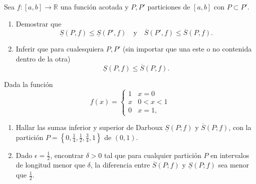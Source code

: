 \documentclass{book}
\begin{document}
 

\begin{ejer}{} 
Sea $f:[a,b]\to\mathbb{R}$ una función acotada y $P,P'$ particiones de $[a,b]$ con $P\subset P'$. 
\begin{enumerate}
\item Demostrar que 
  \[
  \underline{S}(P,f)\leq \underline{S}(P',f)\quad\text{y}\quad \overline{S}(P',f)\leq \overline{S}(P,f).
 \]
 \item 
 Inferir que para cualesquiera $P,P'$ (sin importar que una este o no contenida dentro de la otra)
   \[
\underline{S}(P,f)\leq \overline{S}(P,f).
 \]
\end{enumerate}
\end{ejer}  

\begin{ejer}{} Dada la función  
\[ 
f(x)=\left
\{\begin{array}{ll}
1&x=0\\
x&0<x<1\\
0&x=1,
\end{array}
\right.\]
\begin{enumerate}
    \item Hallar las sumas inferior y superior de Darboux $\underline{S}(P;f)$ y $\overline{S}(P;f)$, 
    con la partición $P=\left\{0,\frac{1}{4},\frac{1}{2},\frac{3}{4},1\right\}$ de $(0,1)$. \item Dado $\epsilon=\frac{1}{2}$, 
encontrar $\delta>0$ tal que para cualquier partición $P$ en intervalos de longitud menor que $\delta$, 
la diferencia entre $\overline{S}(P;f)$ y $\underline{S}(P;f)$ sea menor que $\frac{1}{2}$.
\end{enumerate}
\end{ejer}  
\end{document}
